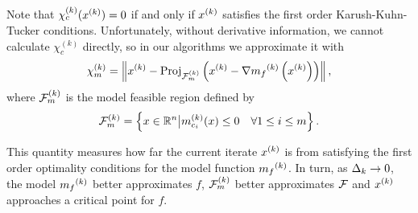 Note that $\chi_c^{(k)}(x^{(k)}) = 0$ if and only if $x^{(k)}$ satisfies the first order Karush-Kuhn-Tucker conditions.
Unfortunately,  without derivative information, we cannot calculate $\chi_c^{(k)}$ directly, so in our algorithms we approximate it with
\begin{align}
\label{define_criticality_measure}
{\chi_m^{(k)}} = \left\|x^{(k)} - {\textrm{Proj}}_{{\mathcal F_m^{(k)}}}\left(x^{(k)}- \nabla {{m}_f}^{(k)}\left(x^{(k)}\right)\right)\right\|,
\end{align}
where ${\mathcal F_m^{(k)}}$ is the model feasible region defined by
\begin{align}
{\mathcal F_m^{(k)}} = \left\{x \in \mathbb R^n \big| {{m}^{(k)}_{c_i}}(x) \le 0 \quad \forall 1 \le i \le m \right\}.  \label{define_feasiblek}
\end{align}

This quantity measures how far the current iterate $x^{(k)}$ is from satisfying the first order optimality conditions for the model function ${{m}_f}^{(k)}$.
In turn, as $\Delta_k \to 0$, the model ${{m}_f}^{(k)}$ better approximates $f$, ${\mathcal F_m^{(k)}}$ better approximates ${\mathcal F}$ and $x^{(k)}$ approaches a critical point for $f$.





%
%
%





